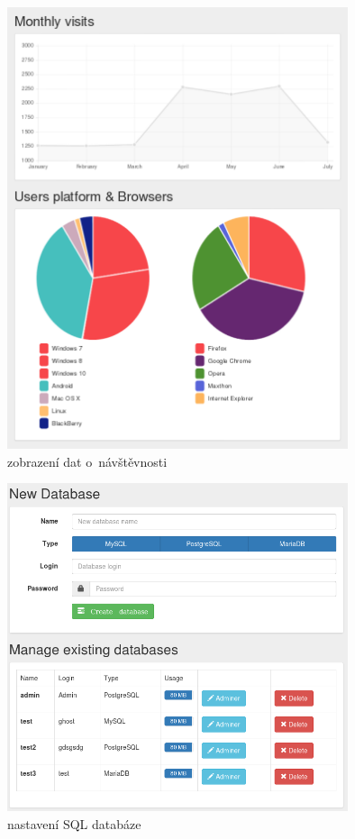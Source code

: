 \documentclass[11pt,a4paper]{article}
\begin{document}
    \begin{figure}[ht]
      \begin{center}
        \includegraphics[width=10cm]{graphs}
        \caption{zobrazení dat o~návštěvnosti}
      \end{center}
    \end{figure}

    \begin{figure}[ht]
      \begin{center}
        \includegraphics[width=10cm]{sql}
        \caption{nastavení SQL databáze}
      \end{center}
    \end{figure}
\end{document}
